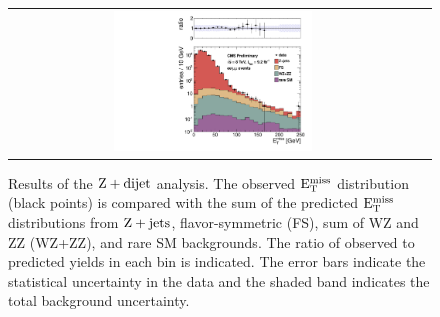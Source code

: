 \begin{figure}[!h]
\begin{center}
\begin{tabular}{cc}
\includegraphics[width=0.5\textwidth]{plots/pfmet_bvetoMedium_all.pdf}
\end{tabular}
\caption{Results of the $\rm{Z}+{dijet}$ analysis. The observed $\rm{E_{T}^{miss}}$ distribution (black points) is compared with the sum of the predicted $\rm{E_{T}^{miss}}$
distributions from $\rm{Z}+\rm{jets}$, flavor-symmetric (FS), sum of WZ and ZZ (WZ+ZZ), and rare SM backgrounds. The ratio of observed to predicted yields in each bin is
indicated. The error bars indicate the statistical uncertainty in the data and the shaded band indicates the total background uncertainty.
\label{fig:results_targ}
}
\end{center}
\end{figure}




